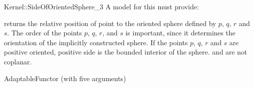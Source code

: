 \begin{ccRefFunctionObjectConcept}{Kernel::SideOfOrientedSphere_3}
A model for this must provide:


         {returns the relative position of point 
          to the oriented sphere defined by $p$, $q$, $r$ and $s$.
          The order of the points $p$, $q$, $r$, and $s$ is important,
          since it determines the orientation of the implicitly
          constructed sphere. If the points $p$, $q$, $r$ and $s$
          are positive oriented, positive side is the bounded interior
          of the sphere.
          \ccPrecond {} and  are not coplanar.}

\ccRefines
AdaptableFunctor (with five arguments)

\ccSeeAlso
{} \\


\end{ccRefFunctionObjectConcept}
